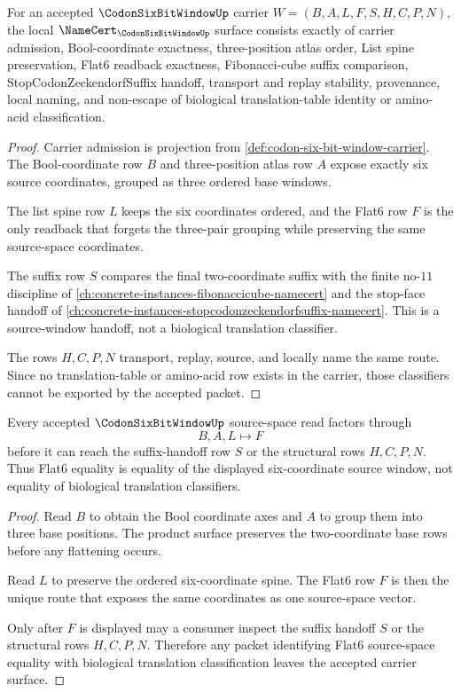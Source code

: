\begin{theorem}
\label{thm:codon-six-bit-window-namecert-obligations}
For an accepted $\CodonSixBitWindowUp$ carrier $W=(B,A,L,F,S,H,C,P,N)$, the local $\NameCert_{\CodonSixBitWindowUp}$ surface consists exactly of carrier admission, Bool-coordinate exactness, three-position atlas order, List spine preservation, Flat6 readback exactness, Fibonacci-cube suffix comparison, StopCodonZeckendorfSuffix handoff, transport and replay stability, provenance, local naming, and non-escape of biological translation-table identity or amino-acid classification.
\end{theorem}
\begin{proof}
Carrier admission is projection from \autoref{def:codon-six-bit-window-carrier}. The Bool-coordinate row $B$ and three-position atlas row $A$ expose exactly six source coordinates, grouped as three ordered base windows.

The list spine row $L$ keeps the six coordinates ordered, and the Flat6 row $F$ is the only readback that forgets the three-pair grouping while preserving the same source-space coordinates.

The suffix row $S$ compares the final two-coordinate suffix with the finite no-$11$ discipline of \autoref{ch:concrete-instances-fibonaccicube-namecert} and the stop-face handoff of \autoref{ch:concrete-instances-stopcodonzeckendorfsuffix-namecert}. This is a source-window handoff, not a biological translation classifier.

The rows $H,C,P,N$ transport, replay, source, and locally name the same route. Since no translation-table or amino-acid row exists in the carrier, those classifiers cannot be exported by the accepted packet.
\end{proof}

\begin{theorem}
\label{thm:codon-six-bit-window-flat-six-readback}
Every accepted $\CodonSixBitWindowUp$ source-space read factors through
$$
B,A,L \longmapsto F
$$
before it can reach the suffix-handoff row $S$ or the structural rows $H,C,P,N$. Thus Flat6 equality is equality of the displayed six-coordinate source window, not equality of biological translation classifiers.
\end{theorem}
\begin{proof}
Read $B$ to obtain the Bool coordinate axes and $A$ to group them into three base positions. The product surface preserves the two-coordinate base rows before any flattening occurs.

Read $L$ to preserve the ordered six-coordinate spine. The Flat6 row $F$ is then the unique route that exposes the same coordinates as one source-space vector.

Only after $F$ is displayed may a consumer inspect the suffix handoff $S$ or the structural rows $H,C,P,N$. Therefore any packet identifying Flat6 source-space equality with biological translation classification leaves the accepted carrier surface.
\end{proof}

